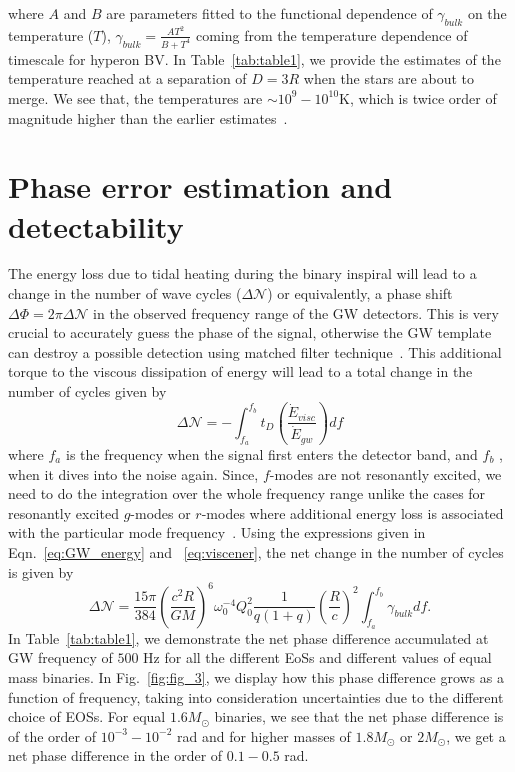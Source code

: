 \documentclass[%
 reprint,
 amsmath,amssymb,
 aps,
]{revtex4-2}
\begin{document}
where $A$ and $B$ are parameters fitted to the functional dependence of $\gamma_{bulk}$ on the temperature ($T$), $\gamma_{bulk} = \frac{AT^2}{B+T^4}$ coming from the temperature dependence of timescale for hyperon BV. In Table~\ref{tab:table1}, we provide the estimates of the temperature reached at a separation of $D = 3R$ when the stars are about to merge. We see that, the temperatures are $\sim 10^9 - 10^{10}$K, which is twice order of magnitude higher than the earlier estimates~\cite{Lai_1994,Arras2019}. 

\section{Phase error estimation and detectability}
The energy loss due to tidal heating during the binary inspiral will lead to a change in the number of wave cycles ($\Delta\mathcal{N}$) or equivalently, a phase shift $\Delta\Phi = 2\pi\Delta\mathcal{N}$ in the observed frequency range of the GW detectors. This is very crucial to accurately guess the phase of the signal, otherwise the GW template can destroy a possible detection using matched filter technique~\cite{Matchfilter_2008}.  This additional torque to the viscous dissipation of energy will lead to a total change in the number of cycles given by
\begin{equation}\label{eq:N}
    \Delta\mathcal{N} = -\int_{f_a}^{f_b} t_D\left(\frac{\Dot{E}_{visc}}{\Dot{E}_{gw}}\right)df
\end{equation}
where $f_a$ is the frequency when the signal first enters the detector band, and $f_b$ , when it dives into the noise again. Since, $f$-modes are not resonantly excited, we need to do the integration over the whole frequency range unlike the cases for resonantly excited $g$-modes or $r$-modes where additional energy loss is associated with the particular mode frequency~\cite{Andersson_2018,Ma2021}. Using the expressions given in Eqn.~\eqref{eq:GW_energy} and ~\eqref{eq:viscener}, the net change in the number of cycles is given by
\begin{equation}\label{eq:error}
   \Delta\mathcal{N}  = \frac{15\pi}{384}\left(\frac{c^2R}{GM}\right)^6 \omega_0^{-4}Q_0^2\frac{1}{q(1+q)}\left(\frac{R}{c}\right)^2\int_{f_a}^{f_b} \gamma_{bulk} df.    
\end{equation}
In Table~\ref{tab:table1}, we demonstrate the net phase difference accumulated at GW frequency of $500$ Hz for all the different EoSs and different values of equal mass binaries. In Fig.~\ref{fig:fig_3}, we display how this phase difference grows as a function of frequency, taking into consideration uncertainties due to the different choice of EOSs. For equal $1.6M_{\odot}$ binaries, we see that the net phase difference is of the order of $10^{-3} - 10^{-2}$ rad and for higher masses of $1.8M_{\odot}$ or $2M_{\odot}$,  we get a net phase difference in the order of $0.1-0.5$ rad. \\
\end{document}
